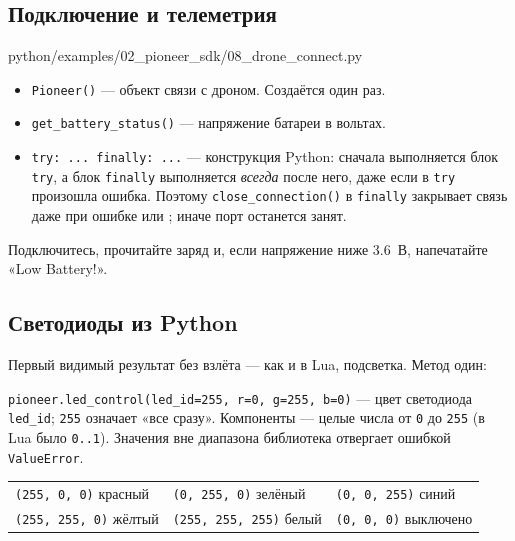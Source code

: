 \subsection{Подключение и телеметрия}

\begin{codefile}[python]{python/examples/02_pioneer_sdk/08_drone_connect.py}
\end{codefile}

\begin{itemize}
    \item \verb|Pioneer()| --- объект связи с дроном. Создаётся один раз.
    \item \verb|get_battery_status()| --- напряжение батареи в вольтах.
    \item \verb|try: ... finally: ...| --- конструкция Python: сначала выполняется блок \verb|try|, а блок \verb|finally| выполняется \emph{всегда} после него, даже если в \verb|try| произошла ошибка. Поэтому \verb|close_connection()| в \verb|finally| закрывает связь даже при ошибке или ; иначе порт останется занят.
\end{itemize}

\begin{taskbox}[Диагностика]
Подключитесь, прочитайте заряд и, если напряжение ниже 3.6~В, напечатайте «Low Battery!».
\end{taskbox}

\subsection{Светодиоды из Python}

Первый видимый результат без взлёта --- как и в Lua, подсветка. Метод один:

\begin{codebox}
\verb|pioneer.led_control(led_id=255, r=0, g=255, b=0)| --- цвет светодиода \verb|led_id|; \verb|255| означает «все сразу». Компоненты --- целые числа от \verb|0| до \verb|255| (в Lua было \verb|0..1|). Значения вне диапазона библиотека отвергает ошибкой \verb|ValueError|.
\end{codebox}

\begin{center}
\small
\begin{tabular}{@{}lll@{}}
\toprule
\verb|(255, 0, 0)| красный & \verb|(0, 255, 0)| зелёный & \verb|(0, 0, 255)| синий \\
\verb|(255, 255, 0)| жёлтый & \verb|(255, 255, 255)| белый & \verb|(0, 0, 0)| выключено \\
\bottomrule
\end{tabular}
\end{center}

